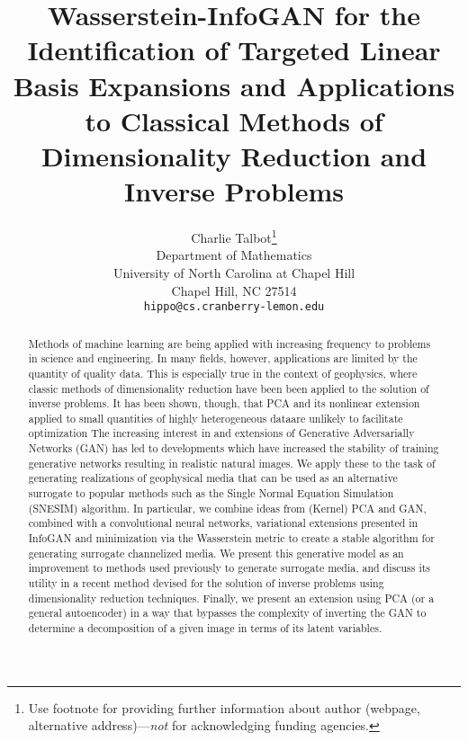 \documentclass{article}
\title{Wasserstein-InfoGAN for the Identification of Targeted Linear Basis Expansions and Applications to Classical Methods of Dimensionality Reduction and Inverse Problems  }
\author{
  Charlie Talbot\thanks{Use footnote for providing further
    information about author (webpage, alternative
    address)---\emph{not} for acknowledging funding agencies.} \\
  Department of Mathematics\\
  University of North Carolina at Chapel Hill\\
  Chapel Hill, NC 27514 \\
  \texttt{hippo@cs.cranberry-lemon.edu} \\
}
\begin{document}
\maketitle

\begin{abstract}
Methods of machine learning are being applied with increasing frequency to problems in science and engineering.  In many fields, however, applications are limited by the quantity of quality data.  This is especially true in the context of geophysics, where classic methods of dimensionality reduction have been been applied to the solution of inverse problems.  It has been shown, though, that PCA and its nonlinear extension applied to small quantities of highly heterogeneous dataare unlikely to facilitate optimization  The increasing interest in and extensions of Generative Adversarially Networks (GAN) has led to developments which have increased the stability of training generative networks resulting in realistic natural images.  We apply these to the task of generating realizations of geophysical media that can be used as an alternative surrogate to popular methods such as the Single Normal Equation Simulation (SNESIM) algorithm.  In particular, we combine ideas from (Kernel) PCA and GAN, combined with a convolutional neural networks, variational extensions presented in InfoGAN and minimization via the Wasserstein metric to create a stable algorithm for generating surrogate channelized media.  We present this generative model as an improvement to methods used previously to generate surrogate media, and discuss its utility in a recent method devised for the solution of inverse problems using dimensionality reduction techniques.  Finally, we present an extension using PCA (or a general autoencoder) in a way that bypasses the complexity of inverting the GAN to determine a decomposition of a given image in terms of its latent variables.
\end{abstract}

\end{document}
